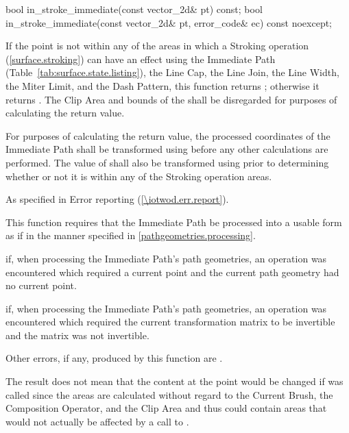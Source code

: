 \begin{itemdecl}
bool in_stroke_immediate(const vector_2d& pt) const;
bool in_stroke_immediate(const vector_2d& pt, error_code& ec) const noexcept;
\end{itemdecl}
\begin{itemdescr}
\pnum
\returns
If the point  is not within any of the areas in which a Stroking operation (\ref{surface.stroking}) can have an effect using the Immediate Path (Table~\ref{tab:surface.state.listing}), the Line Cap, the Line Join, the Line Width, the Miter Limit, and the Dash Pattern, this function returns ; otherwise it returns . The Clip Area and bounds of the \underlyingsurface shall be disregarded for purposes of calculating the return value.

\pnum
For purposes of calculating the return value, the processed coordinates of the Immediate Path shall be transformed using  before any other calculations are performed. The value of  shall also be transformed using  prior to determining whether or not it is within any of the Stroking operation areas.

\pnum
\throws
As specified in Error reporting (\ref{\iotwod.err.report}).

\pnum
\remarks
This function requires that the Immediate Path be processed into a usable form as if in the manner specified in \ref{pathgeometries.processing}.

\pnum
\errors
{} if, when processing the Immediate Path's path geometries, an operation was encountered which required a current point and the current path geometry had no current point.

\pnum
{} if, when processing the Immediate Path's path geometries, an operation was encountered which required the current transformation matrix to be invertible and the matrix was not invertible.

\pnum
Other errors, if any, produced by this function are .

\pnum
\realnotes
The result does not mean that the content at the point  would be changed if  was called since the areas are calculated without regard to the Current Brush, the Composition Operator, and the Clip Area and thus could contain areas that would not actually be affected by a call to .
\end{itemdescr}

